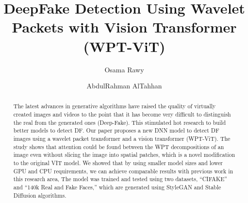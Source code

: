 \documentclass{svproc}
\begin{document}
\mainmatter		 %
%
\title{DeepFake Detection Using Wavelet Packets with Vision Transformer
  (WPT-ViT)}
%
%
\author{Osama Rawy \and AbdulRahman AlTahhan}
%
%
%

\maketitle		%

\begin{abstract}
  The latest advances in generative algorithms have raised the quality of
  virtually created images and videos to the point that it has become very
  difficult to distinguish the real from the generated ones (Deep-Fake). This
  stimulated hot research to build better models to detect DF.	Our paper
  proposes a new DNN model to detect DF images using a wavelet packet
  transformer
  and a vision transformer (WPT-ViT). The study shows that attention could be
  found between the WPT decompositions of an image even without slicing the
  image
  into spatial patches, which is a novel modification to the original VIT
  model.
  We showed that by using smaller model sizes and lower GPU and CPU
  requirements,
  we can achieve comparable results with previous work in this research area,
  The
  model was trained and tested using two datasets, “CIFAKE” and “140k Real and
  Fake Faces,” which are generated using StyleGAN and Stable Diffusion
  algorithms.
 

\end{abstract}
%
\end{document}
